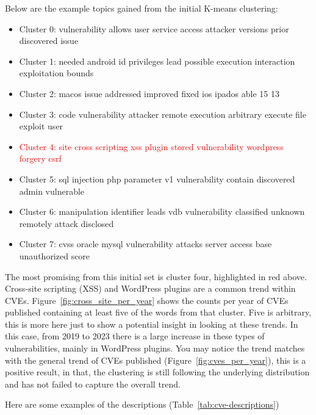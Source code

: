 Below are the example topics gained from the initial K-means clustering:
\begin{itemize}

	\item Cluster 0: vulnerability allows user service access attacker versions prior discovered issue
	\item Cluster 1: needed android id privileges lead possible execution interaction exploitation bounds
	\item Cluster 2: macos issue addressed improved fixed ios ipados able 15 13
	\item Cluster 3: code vulnerability attacker remote execution arbitrary execute file exploit user
	\item \textcolor{red}{Cluster 4: site cross scripting xss plugin stored vulnerability wordpress forgery csrf}
	\item Cluster 5: sql injection php parameter v1 vulnerability contain discovered admin vulnerable
	\item Cluster 6: manipulation identifier leads vdb vulnerability classified unknown remotely attack disclosed
	\item Cluster 7: cvss oracle mysql vulnerability attacks server access base unauthorized score
\end{itemize}


The most promising from this initial set is cluster four, highlighted in red above. Cross-site scripting (XSS) and WordPress plugins are a common trend within CVEs. Figure~\ref{fig:cross_site_per_year} shows the counts per year of CVEs published containing at least five of the words from that cluster. Five is arbitrary, this is more here just to show a potential insight in looking at these trends. In this case, from 2019 to 2023 there is a large increase in these types of vulnerabilities, mainly in WordPress plugins. You may notice the trend matches with the general trend of CVEs published (Figure~\ref{fig:cves_per_year}), this is a positive result, in that, the clustering is still following the underlying distribution and has not failed to capture the overall trend.


Here are some examples of the descriptions (Table~\ref{tab:cve-descriptions})

